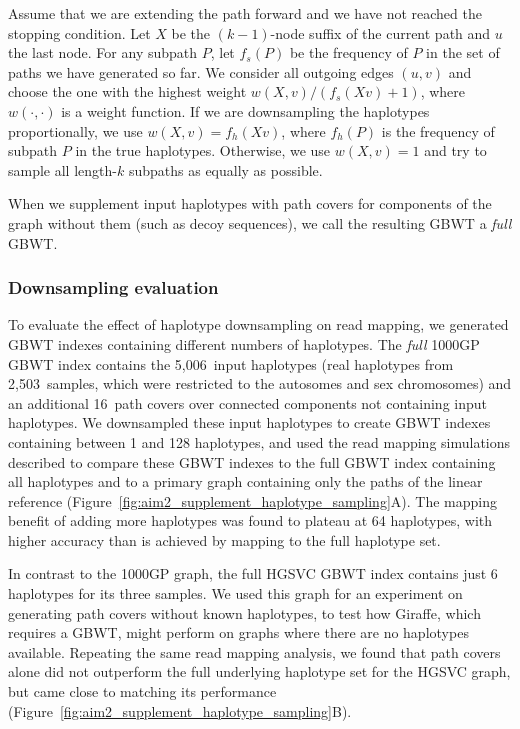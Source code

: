 \documentclass[11pt]{ucscthesis}
\newcommand{\vocab}[1]{\emph{#1}}
\begin{document}
Assume that we are extending the path forward and we have not reached the stopping condition.
Let $X$ be the $(k-1)$-node suffix of the current path and $u$ the last node.
For any subpath $P$, let $f_{s}(P)$ be the frequency of $P$ in the set of paths we have generated so far.
We consider all outgoing edges $(u, v)$ and choose the one with the highest weight $w(X, v) / (f_{s}(Xv) + 1)$, where $w(\cdot, \cdot)$ is a weight function.
If we are downsampling the haplotypes proportionally, we use $w(X, v) = f_{h}(Xv)$, where $f_{h}(P)$ is the frequency of subpath $P$ in the true haplotypes.
Otherwise, we use $w(X, v) = 1$ and try to sample all length-$k$ subpaths as equally as possible.

When we supplement input haplotypes with path covers for components of the graph without them (such as decoy sequences), we call the resulting GBWT a \vocab{full} GBWT.

\subsubsection{Downsampling evaluation}
\label{subsec:downsamplingeval}

To evaluate the effect of haplotype downsampling on read mapping, we generated GBWT indexes containing different numbers of haplotypes.
The \vocab{full} 1000GP GBWT index contains the 5,006~input haplotypes (real haplotypes from 2,503~samples, which were restricted to the autosomes and sex chromosomes) and an additional 16~path covers over connected components not containing input haplotypes.
We downsampled these input haplotypes to create GBWT indexes containing between 1 and 128 haplotypes, and used the read mapping simulations described to compare these GBWT indexes to the full GBWT index containing all haplotypes and to a primary graph containing only the paths of the linear reference (Figure~\ref{fig:aim2_supplement_haplotype_sampling}A).
The mapping benefit of adding more haplotypes was found to plateau at 64 haplotypes, with higher accuracy than is achieved by mapping to the full haplotype set.

In contrast to the 1000GP graph, the full HGSVC GBWT index contains just 6 haplotypes for its three samples. We used this graph for an experiment on generating path covers without known haplotypes, to test how Giraffe, which requires a GBWT, might perform on graphs where there are no haplotypes available. Repeating the same read mapping analysis, we found that path covers alone did not outperform the full underlying haplotype set for the HGSVC graph, but came close to matching its performance (Figure~\ref{fig:aim2_supplement_haplotype_sampling}B).
\end{document}
